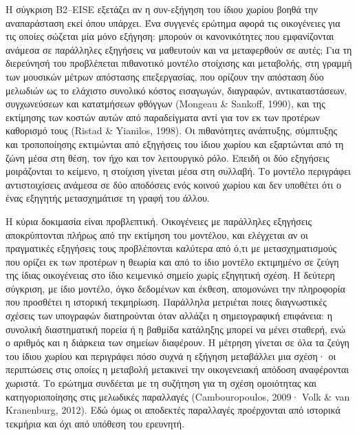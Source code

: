 \documentclass[11pt,a4paper]{article}
\begin{document}
Η σύγκριση B2--EISE εξετάζει αν η συν-εξήγηση του ίδιου χωρίου βοηθά την αναπαράσταση εκεί όπου υπάρχει. Ένα συγγενές ερώτημα αφορά τις οικογένειες για τις οποίες σώζεται μία μόνο εξήγηση: μπορούν οι κανονικότητες που εμφανίζονται ανάμεσα σε παράλληλες εξηγήσεις να μαθευτούν και να μεταφερθούν σε αυτές; Για τη διερεύνησή του προβλέπεται πιθανοτικό μοντέλο στοίχισης και μεταβολής, στη γραμμή των μουσικών μέτρων απόστασης επεξεργασίας, που ορίζουν την απόσταση δύο μελωδιών ως το ελάχιστο συνολικό κόστος εισαγωγών, διαγραφών, αντικαταστάσεων, συγχωνεύσεων και κατατμήσεων φθόγγων (Mongeau \& Sankoff, 1990), και της εκτίμησης των κοστών αυτών από παραδείγματα αντί για τον εκ των προτέρων καθορισμό τους (Ristad \& Yianilos, 1998). Οι πιθανότητες ανάπτυξης, σύμπτυξης και τροποποίησης εκτιμώνται από εξηγήσεις του ίδιου χωρίου και εξαρτώνται από τη ζώνη μέσα στη θέση, τον ήχο και τον λειτουργικό ρόλο. Επειδή οι δύο εξηγήσεις μοιράζονται το κείμενο, η στοίχιση γίνεται μέσα στη συλλαβή. Το μοντέλο περιγράφει αντιστοιχίσεις ανάμεσα σε δύο αποδόσεις ενός κοινού χωρίου και δεν υποθέτει ότι ο ένας εξηγητής μετασχημάτισε τη γραφή του άλλου.

Η κύρια δοκιμασία είναι προβλεπτική. Οικογένειες με παράλληλες εξηγήσεις αποκρύπτονται πλήρως από την εκτίμηση του μοντέλου, και ελέγχεται αν οι πραγματικές εξηγήσεις τους προβλέπονται καλύτερα από ό,τι με μετασχηματισμούς που ορίζει εκ των προτέρων η θεωρία και από το ίδιο μοντέλο εκτιμημένο σε ζεύγη της ίδιας οικογένειας στο ίδιο κειμενικό σημείο χωρίς εξηγητική σχέση. Η δεύτερη σύγκριση, με ίδιο μοντέλο, όγκο δεδομένων και έκθεση, απομονώνει την πληροφορία που προσθέτει η ιστορική τεκμηρίωση. Παράλληλα μετριέται ποιες διαγνωστικές σχέσεις των υπογραφών διατηρούνται όταν αλλάζει η σημειογραφική επιφάνεια: η συνολική διαστηματική πορεία ή η βαθμίδα κατάληξης μπορεί να μένει σταθερή, ενώ ο αριθμός και η διάρκεια των σημείων διαφέρουν. Η μέτρηση γίνεται σε όλα τα ζεύγη του ίδιου χωρίου και περιγράφει πόσο συχνά η εξήγηση μεταβάλλει μια σχέση· οι περιπτώσεις στις οποίες η μεταβολή μετακινεί την οικογενειακή απόδοση αναφέρονται χωριστά. Το ερώτημα συνδέεται με τη συζήτηση για τη σχέση ομοιότητας και κατηγοριοποίησης στις μελωδικές παραλλαγές (Cambouropoulos, 2009· Volk \& van Kranenburg, 2012). Εδώ όμως οι αποδεκτές παραλλαγές προέρχονται από ιστορικά τεκμήρια και όχι από υπόθεση του ερευνητή.
\end{document}
